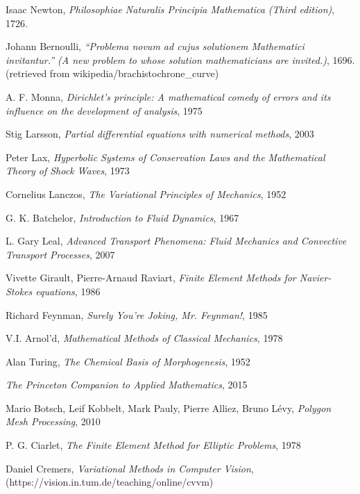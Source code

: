 \documentclass[11pt,a4paper]{memoir}
\begin{document}
\begin{thebibliography}{9}

Isaac Newton, \textit{Philosophiae Naturalis Principia Mathematica (Third edition)}, 1726.

Johann Bernoulli, \textit{``Problema novum ad cujus solutionem Mathematici invitantur.'' (A new problem to whose solution mathematicians are invited.)}, 1696.
(retrieved from wikipedia/brachistochrone\_curve)

A. F. Monna, \textit{Dirichlet's principle: A mathematical comedy of errors and its influence on the development of analysis}, 1975

Stig Larsson, \textit{Partial differential equations with numerical methods}, 2003

Peter Lax, \textit{Hyperbolic Systems of Conservation Laws and the Mathematical Theory of Shock Waves}, 1973

Cornelius Lanczos, \textit{The Variational Principles of Mechanics}, 1952

G. K. Batchelor, \textit{Introduction to Fluid Dynamics}, 1967

L. Gary Leal, \textit{Advanced Transport Phenomena: Fluid Mechanics and Convective Transport Processes}, 2007

Vivette Girault, Pierre-Arnaud Raviart, \textit{Finite Element Methods for Navier-Stokes equations}, 1986

Richard Feynman, \textit{Surely You're Joking, Mr. Feynman!}, 1985

V.I. Arnol'd, \textit{Mathematical Methods of Classical Mechanics}, 1978

Alan Turing, \textit{The Chemical Basis of Morphogenesis}, 1952

\textit{The Princeton Companion to Applied Mathematics}, 2015

Mario Botsch, Leif Kobbelt, Mark Pauly, Pierre Alliez, Bruno L\'evy, \textit{Polygon Mesh Processing}, 2010

P. G. Ciarlet, \textit{The Finite Element Method for Elliptic Problems}, 1978

Daniel Cremers, \textit{Variational Methods in Computer Vision},\\(https://vision.in.tum.de/teaching/online/cvvm)


\end{thebibliography}
\end{document}
